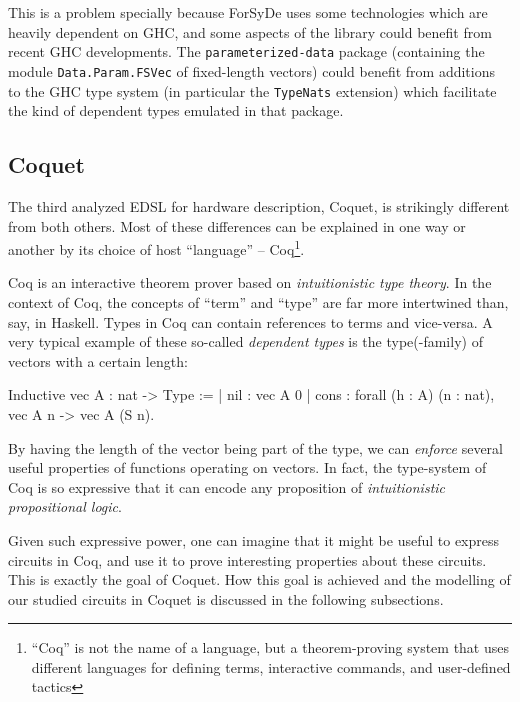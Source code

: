             This is a problem specially because ForSyDe uses some technologies which are heavily
            dependent on GHC, and some aspects of the library could benefit from recent GHC
            developments. The \texttt{parameterized-data} package (containing the module
            \texttt{Data.Param.FSVec} of fixed-length vectors) could benefit from additions to the
            GHC type system (in particular the \texttt{TypeNats}\cite{website:ghc-typenats}
            extension) which facilitate the kind of dependent types emulated in that package.


    \subsection{Coquet}
    \label{subsec:coquet}
        The third analyzed EDSL for hardware description, Coquet\cite{coquet2011}, is strikingly
        different from both others. Most of these differences can be explained in one way or another
        by its choice of host ``language'' -- Coq\footnote{``Coq'' is not the name of a language,
            but a theorem-proving system that uses different languages for defining terms,
            interactive commands, and user-defined tactics}.

        Coq is an interactive theorem prover based on \emph{intuitionistic type theory}. In the
        context of Coq, the concepts of ``term'' and ``type'' are far more intertwined than, say, in
        Haskell. Types in Coq can contain references to terms and vice-versa. A very typical example
        of these so-called \emph{dependent types} is the type(-family) of vectors with a certain
        length:

        \begin{coqcode}
        Inductive vec A : nat -> Type :=
            | nil  : vec A 0
            | cons : forall (h : A) (n : nat),  vec A n -> vec A (S n).
        \end{coqcode}

        By having the length of the vector being part of the type, we can \emph{enforce} several
        useful properties of functions operating on vectors. In fact, the type-system of Coq is so
        expressive that it can encode any proposition of \emph{intuitionistic propositional logic}.

        Given such expressive power, one can imagine that it might be useful to express circuits in
        Coq, and use it to prove interesting properties about these circuits. This is exactly the
        goal of Coquet. How this goal is achieved and the modelling of our studied circuits in
        Coquet is discussed in the following subsections.

